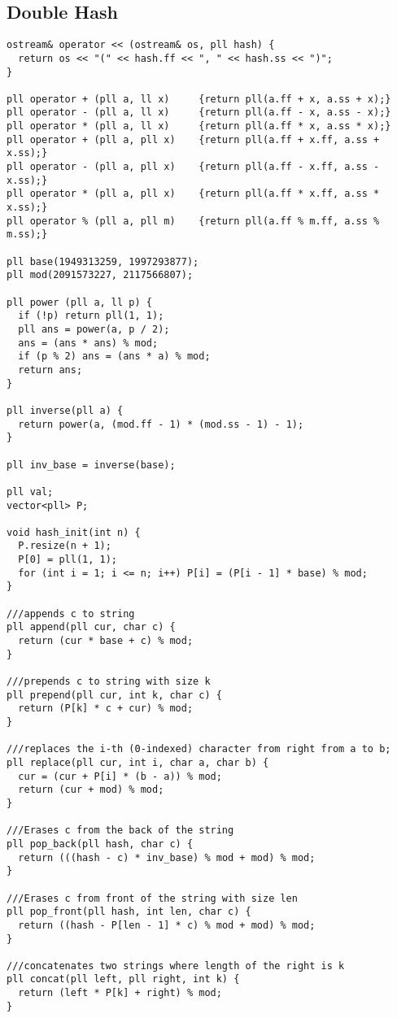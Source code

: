 \documentclass[10pt,a4paper,onesided]{article}
\begin{document}
\begin{multicols*}{3}
\subsection{Double Hash}
\begin{lstlisting}
ostream& operator << (ostream& os, pll hash) {
  return os << "(" << hash.ff << ", " << hash.ss << ")";
}

pll operator + (pll a, ll x)     {return pll(a.ff + x, a.ss + x);}
pll operator - (pll a, ll x)     {return pll(a.ff - x, a.ss - x);}
pll operator * (pll a, ll x)     {return pll(a.ff * x, a.ss * x);}
pll operator + (pll a, pll x)    {return pll(a.ff + x.ff, a.ss + x.ss);}
pll operator - (pll a, pll x)    {return pll(a.ff - x.ff, a.ss - x.ss);}
pll operator * (pll a, pll x)    {return pll(a.ff * x.ff, a.ss * x.ss);}
pll operator % (pll a, pll m)    {return pll(a.ff % m.ff, a.ss % m.ss);}

pll base(1949313259, 1997293877);
pll mod(2091573227, 2117566807);

pll power (pll a, ll p) {
  if (!p) return pll(1, 1);
  pll ans = power(a, p / 2);
  ans = (ans * ans) % mod;
  if (p % 2) ans = (ans * a) % mod;
  return ans;
}

pll inverse(pll a) {
  return power(a, (mod.ff - 1) * (mod.ss - 1) - 1);
}

pll inv_base = inverse(base);

pll val;
vector<pll> P;

void hash_init(int n) {
  P.resize(n + 1);
  P[0] = pll(1, 1);
  for (int i = 1; i <= n; i++) P[i] = (P[i - 1] * base) % mod;
}

///appends c to string
pll append(pll cur, char c) {
  return (cur * base + c) % mod;
}

///prepends c to string with size k
pll prepend(pll cur, int k, char c) {
  return (P[k] * c + cur) % mod;
}

///replaces the i-th (0-indexed) character from right from a to b;
pll replace(pll cur, int i, char a, char b) {
  cur = (cur + P[i] * (b - a)) % mod;
  return (cur + mod) % mod;
}

///Erases c from the back of the string
pll pop_back(pll hash, char c) {
  return (((hash - c) * inv_base) % mod + mod) % mod;
}

///Erases c from front of the string with size len
pll pop_front(pll hash, int len, char c) {
  return ((hash - P[len - 1] * c) % mod + mod) % mod;
}

///concatenates two strings where length of the right is k
pll concat(pll left, pll right, int k) {
  return (left * P[k] + right) % mod;
}


\end{lstlisting}
\end{multicols*}
\end{document}
